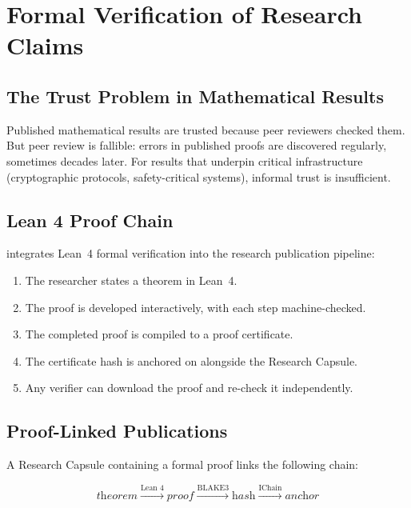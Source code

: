 \section{Formal Verification of Research Claims}

\label{sec:verification}

\subsection{The Trust Problem in Mathematical Results}

Published mathematical results are trusted because peer reviewers checked them. But peer review is fallible: errors in published proofs are discovered regularly, sometimes decades later. For results that underpin critical infrastructure (cryptographic protocols, safety-critical systems), informal trust is insufficient.

\subsection{Lean 4 Proof Chain}

\Zoo{} integrates Lean~4 \cite{demoura2021lean4} formal verification into the research publication pipeline:

\begin{enumerate}
    \item The researcher states a theorem in Lean~4.
    \item The proof is developed interactively, with each step machine-checked.
    \item The completed proof is compiled to a proof certificate.
    \item The certificate hash is anchored on \IChain{} alongside the Research Capsule.
    \item Any verifier can download the proof and re-check it independently.
\end{enumerate}

\subsection{Proof-Linked Publications}

A Research Capsule containing a formal proof links the following chain:

\begin{equation}
\textit{theorem} \xrightarrow{\text{Lean 4}} \textit{proof} \xrightarrow{\text{BLAKE3}} \textit{hash} \xrightarrow{\text{IChain}} \textit{anchor}
\end{equation}

